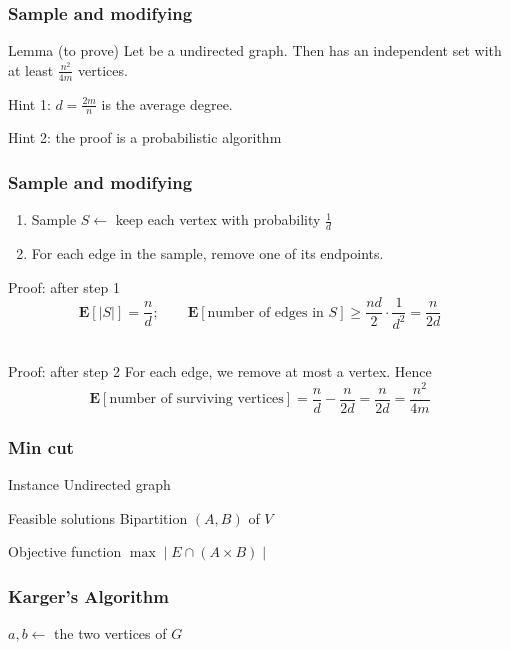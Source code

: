 \begin{frame}[fragile]
	\frametitle{Sample and modifying}
	\begin{block}{Lemma (to prove)}
		Let \g be a undirected graph.
		Then \g has an independent set with at least \(\frac{n^{2}}{4m}\) vertices.
	\end{block}

	Hint 1: \(d = \frac{2m}{n}\) is the average degree.

	Hint 2: the proof is a probabilistic algorithm
\end{frame}

\begin{frame}[fragile]
	\frametitle{Sample and modifying}
	\begin{enumerate}
		\item
		      Sample $S\gets $ keep each vertex with probability $\frac{1}{d}$
		\item
		      For each edge in the sample, remove one of its endpoints.
	\end{enumerate}
	\begin{block}{Proof: after step 1}
		$$\textbf{E}[|S|] = \frac{n}{d}; \qquad
			\textbf{E}[\text{number of edges in }S] \ge \frac{nd}{2} \cdot \frac{1}{d^{2}} = \frac{n}{2d}$$\\
	\end{block}
	\begin{block}{Proof: after step 2}
		For each edge, we remove at most a vertex.
		Hence
		\[\textbf{E}[\text{number of surviving vertices}] = \frac{n}{d} - \frac{n}{2d} = \frac{n}{2d} = \frac{n^{2}}{4m}\]
	\end{block}
\end{frame}

\begin{frame}[fragile]
	\frametitle{Min cut}
	\begin{block}{Instance}
		Undirected graph \g
	\end{block}
	\begin{block}{Feasible solutions}
		Bipartition $(A,B)$ of $V$
	\end{block}
	\begin{block}{Objective function}
		$\max \mid E \cap (A\times B)\mid$
	\end{block}
\end{frame}

\begin{frame}[fragile]
	\frametitle{Karger's Algorithm}

	\begin{algorithm}[H]
		$a,b\gets$ the two vertices of $G$\;
	\end{algorithm}
\end{frame}

